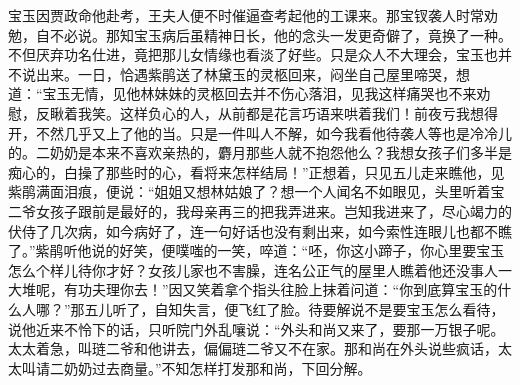 \begin{parag}
    宝玉因贾政命他赴考，王夫人便不时催逼查考起他的工课来。那宝钗袭人时常劝勉，自不必说。那知宝玉病后虽精神日长，他的念头一发更奇僻了，竟换了一种。不但厌弃功名仕进，竟把那儿女情缘也看淡了好些。只是众人不大理会，宝玉也并不说出来。一日，恰遇紫鹃送了林黛玉的灵柩回来，闷坐自己屋里啼哭，想道：“宝玉无情，见他林妹妹的灵柩回去并不伤心落泪，见我这样痛哭也不来劝慰，反瞅着我笑。这样负心的人，从前都是花言巧语来哄着我们！前夜亏我想得开，不然几乎又上了他的当。只是一件叫人不解，如今我看他待袭人等也是冷冷儿的。二奶奶是本来不喜欢亲热的，麝月那些人就不抱怨他么？我想女孩子们多半是痴心的，白操了那些时的心，看将来怎样结局！”正想着，只见五儿走来瞧他，见紫鹃满面泪痕，便说：“姐姐又想林姑娘了？想一个人闻名不如眼见，头里听着宝二爷女孩子跟前是最好的，我母亲再三的把我弄进来。岂知我进来了，尽心竭力的伏侍了几次病，如今病好了，连一句好话也没有剩出来，如今索性连眼儿也都不瞧了。”紫鹃听他说的好笑，便噗嗤的一笑，啐道：“呸，你这小蹄子，你心里要宝玉怎么个样儿待你才好？女孩儿家也不害臊，连名公正气的屋里人瞧着他还没事人一大堆呢，有功夫理你去！”因又笑着拿个指头往脸上抹着问道：“你到底算宝玉的什么人哪？”那五儿听了，自知失言，便飞红了脸。待要解说不是要宝玉怎么看待，说他近来不怜下的话，只听院门外乱嚷说：“外头和尚又来了，要那一万银子呢。太太着急，叫琏二爷和他讲去，偏偏琏二爷又不在家。那和尚在外头说些疯话，太太叫请二奶奶过去商量。”不知怎样打发那和尚，下回分解。
\end{parag}